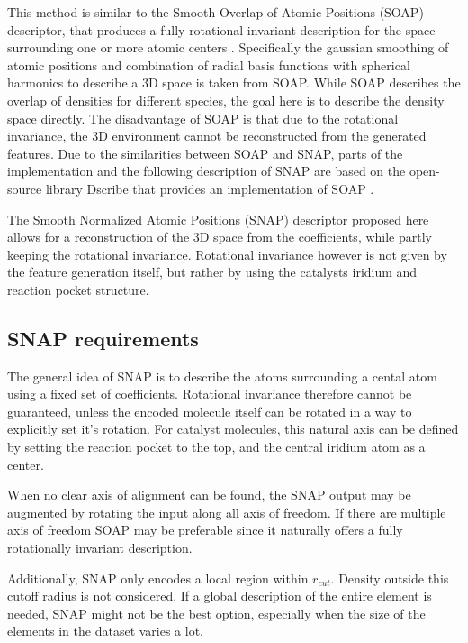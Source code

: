 This method is similar to the Smooth Overlap of Atomic Positions (SOAP) descriptor, that produces a 
fully rotational invariant description for the space surrounding one or more atomic centers \cite{Bart_k_2013}.
Specifically the gaussian smoothing of atomic positions and combination of radial basis functions with
spherical harmonics to describe a 3D space is taken from SOAP.
While SOAP describes the overlap of densities for different species, the goal here is to describe the density space directly.
The disadvantage of SOAP is that due to the rotational invariance, the 3D environment cannot be reconstructed from the generated features.
Due to the similarities between SOAP and SNAP, parts of the implementation and the following description of SNAP are based 
on the open-source library Dscribe that provides an implementation of SOAP \cite{dscribe}.

The Smooth Normalized Atomic Positions (SNAP) descriptor proposed here allows for a reconstruction of the 3D space from the coefficients, 
while partly keeping the rotational invariance.
Rotational invariance however is not given by the feature generation itself, but rather by using the catalysts iridium and reaction pocket structure.

\subsection{SNAP requirements}

The general idea of SNAP is to describe the atoms surrounding a cental atom using a fixed set of coefficients.
Rotational invariance therefore cannot be guaranteed, unless the encoded molecule itself can be rotated in a way to explicitly set it's rotation.
For catalyst molecules, this natural axis can be defined by setting the reaction pocket to the top, and the central iridium atom as a center.


When no clear axis of alignment can be found, the SNAP output may be augmented by rotating the input along all axis of freedom.
If there are multiple axis of freedom SOAP may be preferable since it naturally offers a fully rotationally invariant description.

Additionally, SNAP only encodes a local region within $r_{cut}$.
Density outside this cutoff radius is not considered.
If a global description of the entire element is needed, SNAP might not be the best option, especially when 
the size of the elements in the dataset varies a lot.

